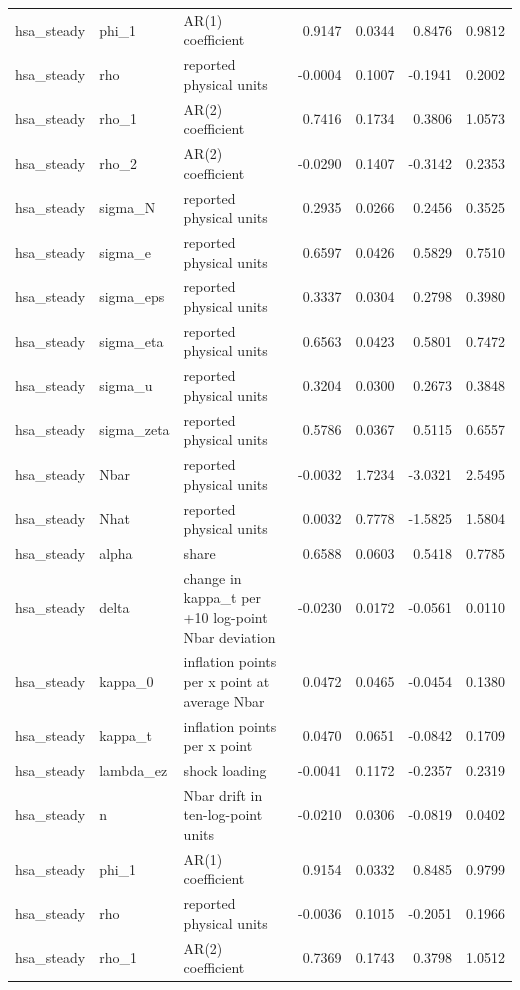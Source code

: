 \begin{tabular}{lllrrrr}
hsa\_steady & phi\_1 & AR(1) coefficient & 0.9147 & 0.0344 & 0.8476 & 0.9812 \\
hsa\_steady & rho & reported physical units & -0.0004 & 0.1007 & -0.1941 & 0.2002 \\
hsa\_steady & rho\_1 & AR(2) coefficient & 0.7416 & 0.1734 & 0.3806 & 1.0573 \\
hsa\_steady & rho\_2 & AR(2) coefficient & -0.0290 & 0.1407 & -0.3142 & 0.2353 \\
hsa\_steady & sigma\_N & reported physical units & 0.2935 & 0.0266 & 0.2456 & 0.3525 \\
hsa\_steady & sigma\_e & reported physical units & 0.6597 & 0.0426 & 0.5829 & 0.7510 \\
hsa\_steady & sigma\_eps & reported physical units & 0.3337 & 0.0304 & 0.2798 & 0.3980 \\
hsa\_steady & sigma\_eta & reported physical units & 0.6563 & 0.0423 & 0.5801 & 0.7472 \\
hsa\_steady & sigma\_u & reported physical units & 0.3204 & 0.0300 & 0.2673 & 0.3848 \\
hsa\_steady & sigma\_zeta & reported physical units & 0.5786 & 0.0367 & 0.5115 & 0.6557 \\
hsa\_steady & Nbar & reported physical units & -0.0032 & 1.7234 & -3.0321 & 2.5495 \\
hsa\_steady & Nhat & reported physical units & 0.0032 & 0.7778 & -1.5825 & 1.5804 \\
hsa\_steady & alpha & share & 0.6588 & 0.0603 & 0.5418 & 0.7785 \\
hsa\_steady & delta & change in kappa\_t per +10 log-point Nbar deviation & -0.0230 & 0.0172 & -0.0561 & 0.0110 \\
hsa\_steady & kappa\_0 & inflation points per x point at average Nbar & 0.0472 & 0.0465 & -0.0454 & 0.1380 \\
hsa\_steady & kappa\_t & inflation points per x point & 0.0470 & 0.0651 & -0.0842 & 0.1709 \\
hsa\_steady & lambda\_ez & shock loading & -0.0041 & 0.1172 & -0.2357 & 0.2319 \\
hsa\_steady & n & Nbar drift in ten-log-point units & -0.0210 & 0.0306 & -0.0819 & 0.0402 \\
hsa\_steady & phi\_1 & AR(1) coefficient & 0.9154 & 0.0332 & 0.8485 & 0.9799 \\
hsa\_steady & rho & reported physical units & -0.0036 & 0.1015 & -0.2051 & 0.1966 \\
hsa\_steady & rho\_1 & AR(2) coefficient & 0.7369 & 0.1743 & 0.3798 & 1.0512 \\

\end{tabular}
